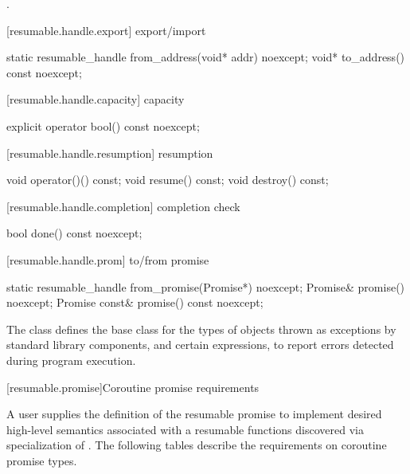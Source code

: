 \begin{itemdescr}
	\pnum\postconditions {}.
\end{itemdescr}

[resumable.handle.export]{ export/import}
\begin{itemdecl}
	static resumable_handle from_address(void* addr) noexcept;		
	void* to_address() const noexcept;
\end{itemdecl}

[resumable.handle.capacity]{ capacity}
\begin{itemdecl}
	explicit operator bool() const noexcept;
\end{itemdecl}

[resumable.handle.resumption]{ resumption}
\begin{itemdecl}
	void operator()() const;
	void resume() const;	
	void destroy() const;
\end{itemdecl}

[resumable.handle.completion]{ completion check}
\begin{itemdecl}
	bool done() const noexcept; 
\end{itemdecl}

[resumable.handle.prom]{ to/from promise}
\begin{itemdecl}
	static resumable_handle from_promise(Promise*) noexcept;		
	Promise& promise() noexcept;		
	Promise const& promise() const noexcept;
\end{itemdecl}

\pnum
The class
defines the base
class for the types of objects thrown as exceptions by
\Cpp standard library components, and certain
expressions, to report errors detected during program execution.


[resumable.promise]{Coroutine promise requirements}

\pnum
A user supplies the definition of the resumable promise to implement 
desired high-level semantics associated with a resumable functions
discovered via specialization of .
The following tables describe the requirements on
coroutine promise types.

